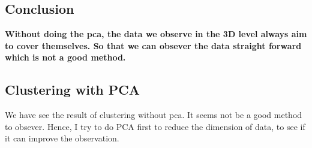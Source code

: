 \documentclass[titlepage,a4paper,12pt,thmsb]{report}
\begin{document}
\subsection{Conclusion}
{\bf Without doing the pca, the data we observe in the 3D level always aim to cover themselves. So that we can obsever the data straight forward which is not a good method.

\newpage


\subsection{Clustering with PCA}

We have see the result of clustering without pca. It seems not be a good method to obsever.  Hence, I try to do PCA first to reduce the dimension of data, to see if it can improve the observation.

\begin{center}
\begin{figure}[h]
{\par}
\end{figure}
{}
\end{center}

\newpage


\begin{center}
\begin{figure}[h]
{\par}
\end{figure}
{}
\end{center}


}
\end{document}

